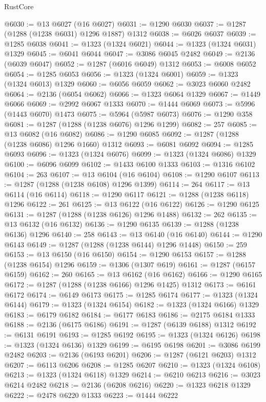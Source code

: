 \begin{lexlean}{RustCore}
\begin{coremodule}
@6030 := @13 @6027 (@16 @6027)
@6031 := @1290 @6030
@6037 := @1287 (@1288 (@1238 @6031) @1296 @1887) @1312
@6038 := @6026 @6037
@6039 := @1285 @6038
@6041 := @1323 (@1324 @6021)
@6044 := @1323 (@1324 @6031) @1329
@6045 := @6041 @6044
@6047 := @3086 @6045 @2482
@6049 := @2136 (@6039 @6047)
@6052 := @1287 (@6016 @6049) @1312
@6053 := @6008 @6052
@6054 := @1285 @6053
@6056 := @1323 (@1324 @6001)
@6059 := @1323 (@1324 @6013) @1329
@6060 := @6056 @6059
@6062 := @3023 @6060 @2482
@6064 := @2136 (@6054 @6062)
@6066 := @1323 @6064 @1329
@6067 := @1449 @6066
@6069 := @2992 @6067 @1333
@6070 := @1444 @6069
@6073 := @5996 (@1443 @6070) @1473
@6075 := @5964 (@5987 @6073)
@6076 := @1290 @358
@6081 := @1287 (@1288 (@1238 @6076) @1296 @1299)
@6082 := 257
@6085 := @13 @6082 (@16 @6082)
@6086 := @1290 @6085
@6092 := @1287 (@1288 (@1238 @6086) @1296 @1660) @1312
@6093 := @6081 @6092
@6094 := @1285 @6093
@6096 := @1323 (@1324 @6076)
@6099 := @1323 (@1324 @6086) @1329
@6100 := @6096 @6099
@6102 := @1433 @6100 @1333
@6103 := @1316 @6102
@6104 := 263
@6107 := @13 @6104 (@16 @6104)
@6108 := @1290 @6107
@6113 := @1287 (@1288 (@1238 @6108) @1296 @1399)
@6114 := 264
@6117 := @13 @6114 (@16 @6114)
@6118 := @1290 @6117
@6121 := @1288 (@1238 @6118) @1296
@6122 := 261
@6125 := @13 @6122 (@16 @6122)
@6126 := @1290 @6125
@6131 := @1287 (@1288 (@1238 @6126) @1296 @1488)
@6132 := 262
@6135 := @13 @6132 (@16 @6132)
@6136 := @1290 @6135
@6139 := @1288 (@1238 @6136) @1296
@6140 := 258
@6143 := @13 @6140 (@16 @6140)
@6144 := @1290 @6143
@6149 := @1287 (@1288 (@1238 @6144) @1296 @1448)
@6150 := 259
@6153 := @13 @6150 (@16 @6150)
@6154 := @1290 @6153
@6157 := @1288 (@1238 @6154) @1296
@6159 := @1306 (@1307 @619)
@6161 := @1287 (@6157 @6159)
@6162 := 260
@6165 := @13 @6162 (@16 @6162)
@6166 := @1290 @6165
@6172 := @1287 (@1288 (@1238 @6166) @1296 @1425) @1312
@6173 := @6161 @6172
@6174 := @6149 @6173
@6175 := @1285 @6174
@6177 := @1323 (@1324 @6144)
@6179 := @1323 (@1324 @6154)
@6182 := @1323 (@1324 @6166) @1329
@6183 := @6179 @6182
@6184 := @6177 @6183
@6186 := @2175 @6184 @1333
@6188 := @2136 (@6175 @6186)
@6191 := @1287 (@6139 @6188) @1312
@6192 := @6131 @6191
@6193 := @1285 @6192
@6195 := @1323 (@1324 @6126)
@6198 := @1323 (@1324 @6136) @1329
@6199 := @6195 @6198
@6201 := @3086 @6199 @2482
@6203 := @2136 (@6193 @6201)
@6206 := @1287 (@6121 @6203) @1312
@6207 := @6113 @6206
@6208 := @1285 @6207
@6210 := @1323 (@1324 @6108)
@6213 := @1323 (@1324 @6118) @1329
@6214 := @6210 @6213
@6216 := @3023 @6214 @2482
@6218 := @2136 (@6208 @6216)
@6220 := @1323 @6218 @1329
@6222 := @2478 @6220 @1333
@6223 := @1444 @6222

\end{coremodule}
\end{lexlean}
